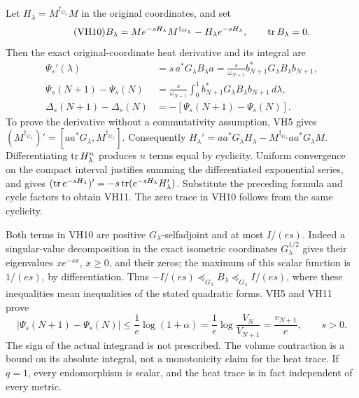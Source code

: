 \documentclass[11pt]{article}
\begin{document}
Let \(H_\lambda=M^{\dagger_{G_\lambda}}M\) in the original coordinates,
and set
\begin{equation}\tag{VH10}\label{hvh:VH10}
B_\lambda=M e^{-sH_\lambda}M^{\dagger_{G_\lambda}}
-H_\lambda e^{-sH_\lambda},\qquad \operatorname{tr} B_\lambda=0.
\end{equation}
Then the exact original-coordinate heat derivative and its integral are
\begin{equation}\tag{VH11}\label{hvh:VH11}
\begin{split}
\Psi_s'(\lambda)&=s\,a^*G_\lambda B_\lambda a
=\frac{s}{\omega_{N+1}}b_{N+1}^*G_\lambda B_\lambda b_{N+1},\\
\Psi_s(N+1)-\Psi_s(N)
&=\frac{s}{\omega_{N+1}}\int_0^1
b_{N+1}^*G_\lambda B_\lambda b_{N+1}\,d\lambda,\\
\Delta_s(N+1)-\Delta_s(N)&=-[\Psi_s(N+1)-\Psi_s(N)].
\end{split}
\end{equation}
To prove the derivative without a commutativity assumption, VH5 gives
\((M^{\dagger_{G_\lambda}})'=[aa^*G_\lambda,M^{\dagger_{G_\lambda}}]\).
Consequently
\(H_\lambda'=aa^*G_\lambda H_\lambda-
M^{\dagger_{G_\lambda}}aa^*G_\lambda M\).
Differentiating \(\operatorname{tr} H_\lambda^n\) produces \(n\) terms equal by
cyclicity. Uniform convergence on the compact interval justifies
summing the differentiated exponential series, and gives
\((\operatorname{tr} e^{-sH_\lambda})'=-s\operatorname{tr}(e^{-sH_\lambda}H_\lambda')\).
Substitute the preceding formula and cycle factors to obtain VH11.
The zero trace in VH10 follows from the same cyclicity.

Both terms in VH10 are positive \(G_\lambda\)-selfadjoint and at most
\(I/(es)\). Indeed a singular-value decomposition in the exact
isometric coordinates \(G_\lambda^{1/2}\) gives their eigenvalues
\(x e^{-sx}\), \(x\ge0\), and their zeros; the maximum of this scalar
function is \(1/(es)\), by differentiation. Thus
\(-I/(es)\preceq_{G_\lambda}B_\lambda\preceq_{G_\lambda}I/(es)\),
where these inequalities mean inequalities of the stated quadratic forms.
VH5 and VH11 prove
\begin{equation}\tag{VH12}\label{hvh:VH12}
\boxed{\quad
|\Psi_s(N+1)-\Psi_s(N)|
\le\frac1e\log(1+\alpha)
=\frac1e\log\frac{V_N}{V_{N+1}}
=\frac{v_{N+1}}e,\qquad s>0.\quad}
\end{equation}
The sign of the actual integrand is not prescribed. The volume
contraction is a bound on its absolute integral, not a monotonicity
claim for the heat trace. If \(q=1\), every endomorphism is scalar,
and the heat trace is in fact independent of every metric.
\end{document}
